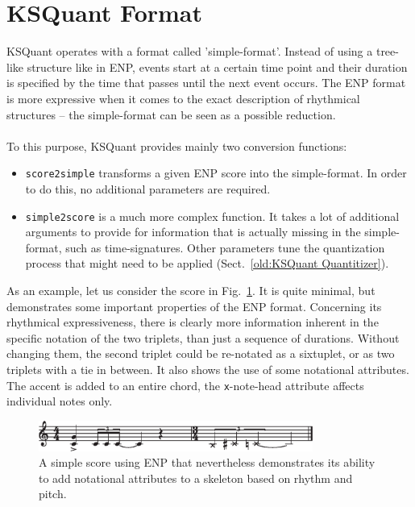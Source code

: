 \documentclass[runningheads,a4paper]{llncs}
\begin{document}
\section{KSQuant  Format}\label{old:KSQuant format}
KSQuant operates with a format called 'simple-format'. Instead of
using a tree-like structure like in ENP, events start at a certain
time point and their duration is specified by the time that passes
until the next event occurs. The ENP format is more expressive when it
comes to the exact description of rhythmical structures -- the
simple-format can be seen as a possible reduction.
\\
\\
To this purpose, KSQuant provides mainly two conversion functions:
\begin{itemize}
\item \texttt{score2simple} transforms a given ENP score into the
  simple-format.  In order to do this, no additional parameters are
  required.
\item \texttt{simple2score} is a much more complex function. It takes
  a lot of additional arguments to provide for information that is
  actually missing in the simple-format, such as
  time-signatures. Other parameters tune the quantization process that
  might need to be applied (Sect.~\ref{old:KSQuant Quantitizer}).
\end{itemize}

As an example, let us consider the score in Fig.~\ref{old:fig:enp-ex1}. It
is quite minimal, but demonstrates some important properties of the
ENP format. Concerning its rhythmical expressiveness, there is clearly
more information inherent in the specific notation of the two
triplets, than just a sequence of durations. Without changing them,
the second triplet could be re-notated as a sixtuplet, or as two
triplets with a tie in between.  It also shows the use of some
notational attributes. The accent is added to an entire chord, the
\texttt{x}-note-head attribute affects individual notes only.

\begin{figure}
  \centering
  \includegraphics[width=9cm]{enp-ex1}
  \caption{A simple score using ENP that nevertheless demonstrates its
    ability to add notational attributes to a skeleton based on rhythm
    and pitch.}
  \label{old:fig:enp-ex1}
\end{figure}
\end{document}
